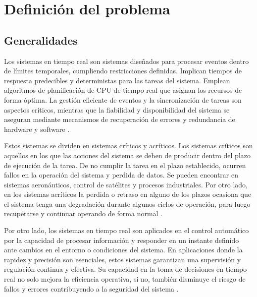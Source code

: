 \documentclass[12pt]{article}
\begin{document}
\newpage

\section{Definición del problema}

\subsection{Generalidades}

Los sistemas en tiempo real son sistemas diseñados para procesar eventos dentro de límites temporales, cumpliendo restricciones definidas. Implican tiempos de respuesta predecibles y deterministas para las tareas del sistema. Emplean algoritmos de planificación de CPU de tiempo real que asignan los recursos de forma óptima. La gestión eficiente de eventos y la sincronización de tareas son aspectos críticos, mientras que la fiabilidad y disponibilidad del sistema se aseguran mediante mecanismos de recuperación de errores y redundancia de hardware y software \cite{de2000introduccion}.

Estos sistemas se dividen en sistemas críticos y acríticos. Los sistemas críticos son aquellos en los que las acciones del sistema se deben de producir dentro del plazo de ejecución de la tarea. De no cumplir la tarea en el plazo establecido, ocurren fallos en la operación del sistema y perdida de datos. Se pueden encontrar en sistemas aeronáuticos, control de satélites y procesos industriales. Por otro lado, en los sistemas acríticos la perdida o retraso en alguno de los plazos ocasiona que el sistema tenga una degradación durante algunos ciclos de operación, para luego recuperarse y continuar operando de forma normal \cite{de2000introduccion} \cite{alonso2010panoramica}.

Por otro lado, los sistemas en tiempo real son aplicados en el control automático por la capacidad de procesar información y responder en un instante definido ante cambios en el entorno o condiciones del sistema. En aplicaciones donde la rapidez y precisión son esenciales, estos sistemas garantizan  una supervisión y regulación continua y efectiva. Su capacidad en la toma de decisiones en tiempo real no solo mejora la eficiencia operativa, si no, también disminuye el riesgo de fallos y errores contribuyendo a la seguridad del sistema \cite{munoz1994extensiones}. 
\end{document}
